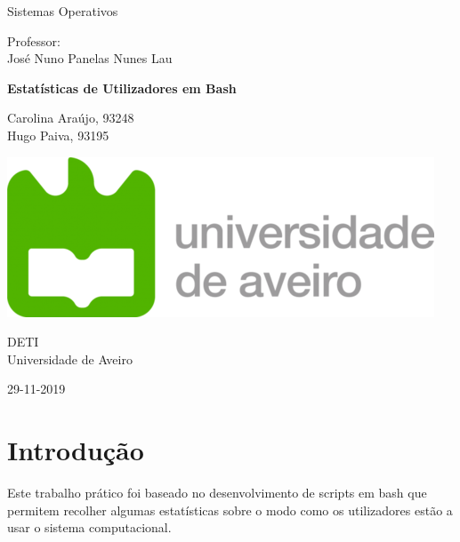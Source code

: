 \documentclass[10pt,portuguese]{article}
\begin{document}

\begin{titlepage}
	\clearpage\thispagestyle{empty}
	\centering
	\vspace{2cm}

	
	{\Large  Sistemas Operativos \par}
	\vspace{0.5cm}
	{\small Professor: \\
	José Nuno Panelas Nunes Lau\par}
	\vspace{4cm}
	{\Huge \textbf{Estatísticas de Utilizadores em Bash}} \\
	\vspace{1cm}
	\vspace{4cm}
	{\normalsize Carolina Araújo, 93248 \\ 
	             Hugo Paiva, 93195
	   \par}
	\vspace{2cm}

    \includegraphics[scale=0.20]{images/logo_ua.png}
    
    \vspace{2cm}
    
	{\normalsize DETI \\ 
		Universidade de Aveiro \par}
		
	{\normalsize 29-11-2019 \par}
	\vspace{2cm}
	
	\pagebreak

\end{titlepage}
\tableofcontents{}
\clearpage

\section{Introdução}
\par Este trabalho prático foi baseado no desenvolvimento de scripts em bash que permitem recolher algumas estatísticas sobre o modo como os utilizadores estão a usar o sistema computacional. 
\end{document}

